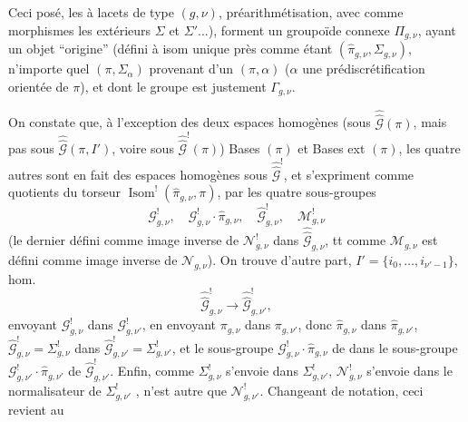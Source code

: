 Ceci posé, les 
  à lacets de type $(g,\nu)$,
 préarithmétisation,
avec comme morphismes les   extérieurs
 $\Sigma$ et $\Sigma'\ldots$),
forment un groupoïde connexe $\Pi_{g,\nu}$, ayant un objet ``origine''
(défini à isom unique près comme étant $(\widehat{\pi}_{g,\nu},\Sigma_{g,\nu})$,
 n'importe quel $(\pi,\Sigma_{\alpha})$ provenant d'un
$(\pi,\alpha)$ ($\alpha$ une prédiscrétification orientée de $\pi$),
et dont le groupe   est justement $\Gamma_{g,\nu}$.


On constate que, à l'exception des deux espaces homogènes
(sous $\widehat{\widehat{\mathcal G}}(\pi)$, mais pas  sous
$\widehat{\widehat{\mathcal G}}(\pi,I')$, voire sous
$\widehat{\widehat{\mathcal G}}^{!}(\pi)$) Bases $(\pi)$ et Bases ext $(\pi)$,
les quatre autres sont en fait des espaces homogènes sous
$\widehat{\widehat{\mathcal G}}^{!}$, et s'expriment comme quotients du
torseur
$\operatorname{Isom}^{!}(\widehat{\pi}_{g,\nu},\pi)$, par les quatre sous-groupes
\[
\mathcal G^{!}_{g,\nu},\quad
\mathcal G^{!}_{g,\nu}\cdot\widehat{\pi}_{g,\nu},\quad
\widehat{\mathcal G}^{!}_{g,\nu},\quad
\mathcal M^{!}_{g,\nu}
\]
(le dernier défini comme image inverse de $\mathcal N^{!}_{g,\nu}$ dans
$\widehat{\widehat{\mathcal G}}_{g,\nu}$, tt comme $\mathcal M_{g,\nu}$ est défini
comme image inverse de $\mathcal N_{g,\nu}$).
On trouve d'autre part,  $I'=\{i_0,\ldots,i_{\nu'-1}\}$,
 hom.
\[
\widehat{\widehat{\mathcal G}}^{!}_{g,\nu}\longrightarrow
\widehat{\widehat{\mathcal G}}^{!}_{g,\nu'},
\]
envoyant $\mathcal G^{!}_{g,\nu}$ dans $\mathcal G^{!}_{g,\nu'}$,
en envoyant $\pi_{g,\nu}$ dans $\pi_{g,\nu'}$, donc $\widehat{\pi}_{g,\nu}$
dans $\widehat{\pi}_{g,\nu'}$,
$\widehat{\mathcal G}^{!}_{g,\nu}=\Sigma^{!}_{g,\nu}$ dans
$\widehat{\mathcal G}^{!}_{g,\nu'}=\Sigma^{!}_{g,\nu'}$, et le sous-groupe
$\mathcal G^{!}_{g,\nu}\cdot\widehat{\pi}_{g,\nu}$ de
 
dans le sous-groupe $\mathcal G^{!}_{g,\nu'}\cdot\widehat{\pi}_{g,\nu'}$ de
$\widehat{\mathcal G}^{!}_{g,\nu'}$.
Enfin, comme $\Sigma^{!}_{g,\nu}$ s'envoie dans $\Sigma^{!}_{g,\nu'}$,
 $\mathcal N^{!}_{g,\nu}$ s'envoie dans le normalisateur
de $\Sigma^{!}_{g,\nu'}$ ,
 n'est autre que $\mathcal N^{!}_{g,\nu'}$.
Changeant de notation, ceci revient au

